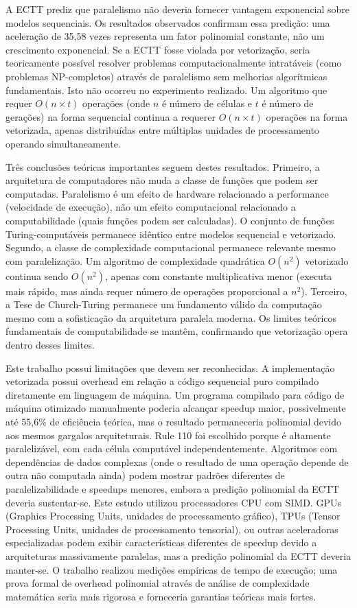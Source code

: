 \documentclass[12pt]{article}
\begin{document}
A ECTT prediz que paralelismo não deveria fornecer vantagem exponencial sobre modelos sequenciais. Os resultados observados confirmam essa predição: uma aceleração de 35,58 vezes representa um fator polinomial constante, não um crescimento exponencial. Se a ECTT fosse violada por vetorização, seria teoricamente possível resolver problemas computacionalmente intratáveis (como problemas NP-completos) através de paralelismo sem melhorias algorítmicas fundamentais. Isto não ocorreu no experimento realizado. Um algoritmo que requer $O(n \times t)$ operações (onde $n$ é número de células e $t$ é número de gerações) na forma sequencial continua a requerer $O(n \times t)$ operações na forma vetorizada, apenas distribuídas entre múltiplas unidades de processamento operando simultaneamente.

Três conclusões teóricas importantes seguem destes resultados. Primeiro, a arquitetura de computadores não muda a classe de funções que podem ser computadas. Paralelismo é um efeito de hardware relacionado a performance (velocidade de execução), não um efeito computacional relacionado a computabilidade (quais funções podem ser calculadas). O conjunto de funções Turing-computáveis permanece idêntico entre modelos sequencial e vetorizado. Segundo, a classe de complexidade computacional permanece relevante mesmo com paralelização. Um algoritmo de complexidade quadrática $O(n^2)$ vetorizado continua sendo $O(n^2)$, apenas com constante multiplicativa menor (executa mais rápido, mas ainda requer número de operações proporcional a $n^2$). Terceiro, a Tese de Church-Turing permanece um fundamento válido da computação mesmo com a sofisticação da arquitetura paralela moderna. Os limites teóricos fundamentais de computabilidade se mantêm, confirmando que vetorização opera dentro desses limites.

Este trabalho possui limitações que devem ser reconhecidas. A implementação vetorizada possui overhead em relação a código sequencial puro compilado diretamente em linguagem de máquina. Um programa compilado para código de máquina otimizado manualmente poderia alcançar speedup maior, possivelmente até 55,6\% de eficiência teórica, mas o resultado permaneceria polinomial devido aos mesmos gargalos arquiteturais. Rule 110 foi escolhido porque é altamente paralelizável, com cada célula computável independentemente. Algoritmos com dependências de dados complexas (onde o resultado de uma operação depende de outra não computada ainda) podem mostrar padrões diferentes de paralelizabilidade e speedups menores, embora a predição polinomial da ECTT deveria sustentar-se. Este estudo utilizou processadores CPU com SIMD. GPUs (Graphics Processing Units, unidades de processamento gráfico), TPUs (Tensor Processing Units, unidades de processamento tensorial), ou outras aceleradoras especializadas podem exibir características diferentes de speedup devido a arquiteturas massivamente paralelas, mas a predição polinomial da ECTT deveria manter-se. O trabalho realizou medições empíricas de tempo de execução; uma prova formal de overhead polinomial através de análise de complexidade matemática seria mais rigorosa e forneceria garantias teóricas mais fortes.
\end{document}

